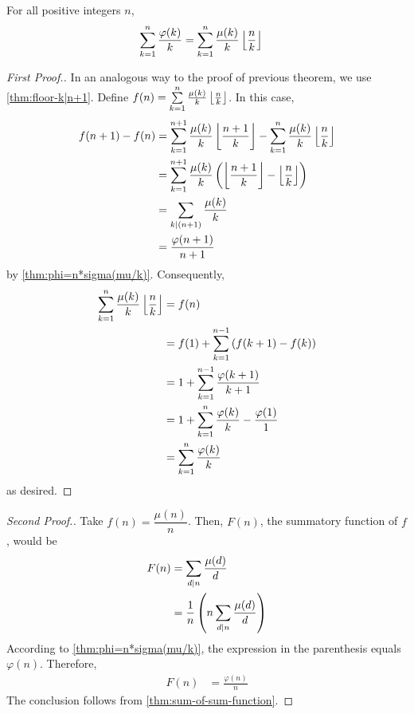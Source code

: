 	\begin{theorem}
		For all positive integers $n$,
			\begin{align*}
				\sum_{k=1}^{n} \frac{\varphi(k)}{k}
					& = \sum_{k=1}^{n} \frac{\mu(k)}{k}\left\lfloor{\frac{n}{k}}\right\rfloor
			\end{align*}
	\end{theorem}

	\begin{proof}[First Proof.]
		In an analogous way to the proof of previous theorem, we use \autoref{thm:floor-k|n+1}. Define $f(n)= \sum\limits_{k=1}^{n} \frac{\mu(k)}{k}\left\lfloor{\frac{n}{k}}\right\rfloor$. In this case,
			\begin{align*}
				f(n+1)-f(n) &= \sum_{k=1}^{n+1} \frac{\mu(k)}{k}\left\lfloor{\frac{n+1}{k}}\right\rfloor- \sum_{k=1}^{n} \frac{\mu(k)}{k}\left\lfloor{\frac{n}{k}}\right\rfloor\\
							&= \sum_{k=1}^{n+1} \frac{\mu(k)}{k}\left(\left\lfloor{\frac{n+1}{k}}\right\rfloor-\left\lfloor{\frac{n}{k}}\right\rfloor\right)\\
							&= \sum_{k\mid (n+1)} \frac{\mu(k)}{k}\\
							&= \frac{\varphi(n+1)}{n+1}
			\end{align*}
		by \autoref{thm:phi=n*sigma(mu/k)}. Consequently,
			\begin{align*}
				\sum\limits_{k=1}^{n} \frac{\mu(k)}{k}\left\lfloor{\frac{n}{k}}\right\rfloor
					& = f(n)\\
					&= f(1) + \sum_{k=1}^{n-1} \left(f(k+1)-f(k)\right)\\
					&= 1 + \sum_{k=1}^{n-1} \frac{\varphi(k+1)}{k+1}\\
					&= 1 + \sum_{k=1}^{n} \frac{\varphi(k)}{k} - \frac{\varphi(1)}{1}\\
					&= \sum_{k=1}^{n} \frac{\varphi(k)}{k}
			\end{align*}
		as desired.
	\end{proof}

	\begin{proof}[Second Proof.]
		Take $f(n)= \dfrac{\mu(n)}{n}$. Then, $F(n)$, the summatory function of $f$, would be
			\begin{align*}
				F(n) &= \sum_{d\mid n} \frac{\mu(d)}{d} \\
				 &= \frac{1}{n}\left(n\sum_{d\mid n} \frac{\mu(d)}{d}\right)
			\end{align*}
		According to \autoref{thm:phi=n*sigma(mu/k)}, the expression in the parenthesis equals $\varphi(n)$. Therefore,
			\begin{align*}
				F(n) &= \frac{\varphi(n)}{n}
			\end{align*}
		The conclusion follows from \autoref{thm:sum-of-sum-function}.
	\end{proof}


